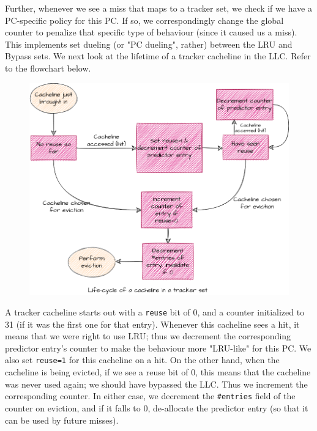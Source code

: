 \documentclass[11pt, swedish, openany]{book}
\begin{document}
Further, whenever we see a miss that maps to a tracker set, we check if we have a PC-specific policy for this PC. If so, we correspondingly change the global counter to penalize that specific type of behaviour (since it caused us a miss). This implements set dueling (or "PC dueling", rather) between the LRU and Bypass sets.
We next look at the lifetime of a tracker cacheline in the LLC. Refer to the flowchart below.
\begin{figure}[H]
    \centering
    \includegraphics[width=0.85\linewidth]{images/lifecycle.png}
\end{figure}
A tracker cacheline starts out with a \texttt{reuse} bit of 0, and a counter initialized to 31 (if it was the first one for that entry). Whenever this cacheline sees a hit, it means that we were right to use LRU; thus we decrement the corresponding predictor entry's counter to make the behaviour more "LRU-like" for this PC. We also set \texttt{reuse=1} for this cacheline on a hit. On the other hand, when the cacheline is being evicted, if we see a reuse bit of 0, this means that the cacheline was never used again; we should have bypassed the LLC. Thus we increment the corresponding counter. In either case, we decrement the \texttt{\#entries} field of the counter on eviction, and if it falls to 0, de-allocate the predictor entry (so that it can be used by future misses). \\
\end{document}
